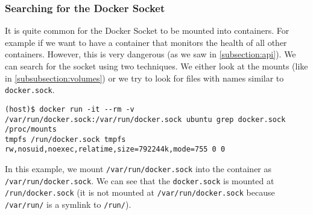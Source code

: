 \subsubsection{Searching for the Docker Socket}
It is quite common for the Docker Socket to be mounted into containers. For example if we want to have a container that monitors the health of all other containers. However, this is very dangerous (as we saw in \autoref{subsection:api}). We can search for the socket using two techniques. We either look at the mounts (like in \autoref{subsubsection:volumes}) or we try to look for files with names similar to \lstinline{docker.sock}.

\begin{lstlisting}[caption={\lstinline{docker.sock} in \lstinline{/proc/mounts}},captionpos=b]
(host)$ docker run -it --rm -v /var/run/docker.sock:/var/run/docker.sock ubuntu grep docker.sock /proc/mounts
tmpfs /run/docker.sock tmpfs rw,nosuid,noexec,relatime,size=792244k,mode=755 0 0
\end{lstlisting}

In this example, we mount \lstinline{/var/run/docker.sock} into the container as \lstinline{/var/run/docker.sock}. We can see that the \lstinline{docker.sock} is mounted at \lstinline{/run/docker.sock} (it is not mounted at \lstinline{/var/run/docker.sock} because \lstinline{/var/run/} is a symlink to \lstinline{/run/}).
